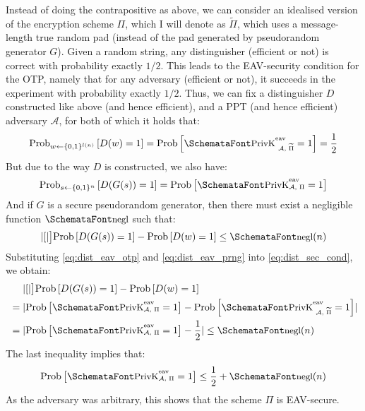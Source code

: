    Instead of doing the contrapositive as above, we can consider an idealised version of the encryption scheme $\Pi$, which I will denote as $\widetilde{\Pi}$, which uses a message-length true random pad (instead of the pad generated by pseudorandom generator $G$). Given a random string, any distinguisher (efficient or not) is correct with probability exactly $1/2$. This leads to the EAV-security condition for the OTP, namely that for any adversary (efficient or not), it succeeds in the \privkeav experiment with probability exactly $1/2$. Thus, we can fix a distinguisher $D$ constructed like above (and hence efficient), and a PPT (and hence efficient) adversary $\mathcal{A}$, for both of which it holds that:
  \begin{equation}
    \label{eq:dist_eav_otp}
    \textup{Prob}_{w \leftarrow \{0, 1\}^{l(n)}}\left[D(w) = 1\right] = \textup{Prob}\left[\privkeavprime = 1\right] = \frac{1}{2}
  \end{equation}
  But due to the way $D$ is constructed, we also have:
  \begin{equation}
    \label{eq:dist_eav_prng}
    \textup{Prob}_{s \leftarrow \{0, 1\}^{n}}\left[D(G(s)) = 1\right] = \textup{Prob}\left[\privkeav = 1\right]
  \end{equation}
  And if $G$ is a secure pseudorandom generator, then there must exist a negligible function $\myemph{negl}$ such that:
  \begin{equation}
    \label{eq:dist_sec_cond}
    \abs*[\big]{\textup{Prob}\left[D(G(s)) = 1\right] - \textup{Prob}\left[D(w) = 1\right]} \le \myemph{negl}(n)
  \end{equation}
  Substituting \eqref{eq:dist_eav_otp} and \eqref{eq:dist_eav_prng} into \eqref{eq:dist_sec_cond}, we obtain:
  \begin{align}
    &\phantom{{}={}}\abs*[\big]{\textup{Prob}\left[D(G(s)) = 1\right] - \textup{Prob}\left[D(w) = 1\right]} \\
    &=\abs{\textup{Prob}\left[\privkeav = 1\right] - \textup{Prob}\left[\privkeavprime = 1\right]} \\
    &=\abs{\textup{Prob}\left[\privkeav = 1\right] - \frac{1}{2}} \le \myemph{negl}(n)
  \end{align}
  The last inequality implies that:
  \begin{equation}
    \textup{Prob}\left[\privkeav = 1\right] \le \frac{1}{2} + \myemph{negl}(n)
  \end{equation}
  As the adversary was arbitrary, this shows that the scheme $\Pi$ is EAV-secure.

